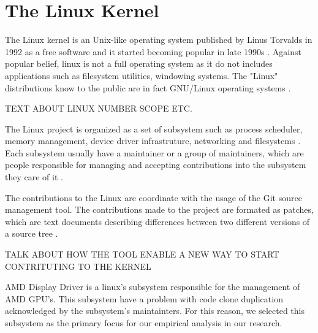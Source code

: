 \en

\section{The Linux Kernel}

The Linux kernel is an Unix-like operating system published by Linus Torvalds in 1992 as a free software and
it started becoming popular in late 1990s \citep{linuxbook}. Against popular belief, linux is not a full 
operating system as it do not includes applications such as filesystem utilities, windowing systems. The "Linux" 
distributions know to the public are in fact GNU/Linux operating systems \citep{gnuref}.

TEXT ABOUT LINUX NUMBER SCOPE ETC.

The Linux project is organized as a set of subsystem such as process scheduler, memory management, 
device driver infrastruture, networking and filesystems \citep{melissa}.
Each subsystem usually have a maintainer or a group of maintainers, which are people responsible 
for managing and accepting contributions into the subsystem they care of it \citep{melissa}. 

The contributions to the Linux are coordinate with the usage of the Git source management tool. The contributions 
made to the project are formated as patches, which are text documents describing differences between two different 
versions of a source tree \citep{melissa}.



TALK ABOUT HOW THE TOOL ENABLE A NEW WAY TO START CONTRITUTING TO THE KERNEL

AMD Display Driver is a linux's subsystem responsible for the management of AMD GPU's. This subsystem have a problem 
with code clone duplication acknowledged by the subsystem's maintainters. For this reason, we selected this
subsystem as the primary focus for our empirical analysis in our research.

